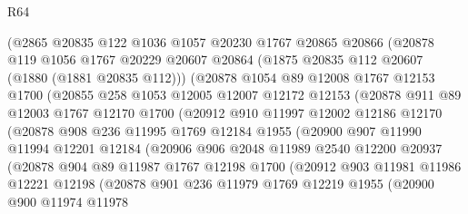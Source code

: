 \begin{lexlean}{R64}
\begin{coremodule}
          (@2865
            @20835
            @122
            @1036
            @1057
            @20230
            @1767
            @20865
            @20866
            (@20878
              @119
              @1056
              @1767
              @20229
              @20607
              @20864
              (@1875 @20835 @112 @20607 (@1880 (@1881 @20835 @112)))
              (@20878
                @1054
                @89
                @12008
                @1767
                @12153
                @1700
                (@20855
                  @258
                  @1053
                  @12005
                  @12007
                  @12172
                  @12153
                  (@20878
                    @911
                    @89
                    @12003
                    @1767
                    @12170
                    @1700
                    (@20912
                      @910
                      @11997
                      @12002
                      @12186
                      @12170
                      (@20878
                        @908
                        @236
                        @11995
                        @1769
                        @12184
                        @1955
                        (@20900
                          @907
                          @11990
                          @11994
                          @12201
                          @12184
                          (@20906
                            @906
                            @2048
                            @11989
                            @2540
                            @12200
                            @20937
                            (@20878
                              @904
                              @89
                              @11987
                              @1767
                              @12198
                              @1700
                              (@20912
                                @903
                                @11981
                                @11986
                                @12221
                                @12198
                                (@20878
                                  @901
                                  @236
                                  @11979
                                  @1769
                                  @12219
                                  @1955
                                  (@20900
                                    @900
                                    @11974
                                    @11978

\end{coremodule}
\end{lexlean}
